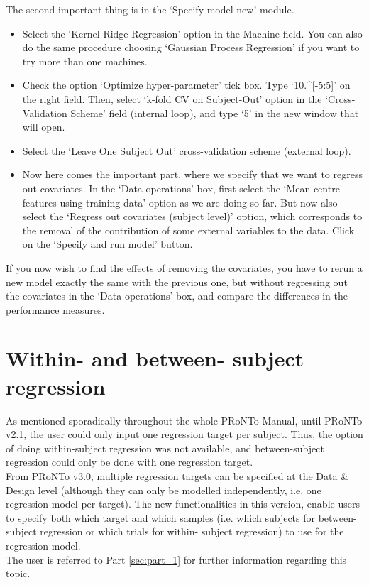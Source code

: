 The second important thing is in the `Specify model new' module.
    
    \begin{itemize}
    
    \item Select the `Kernel Ridge Regression' option in the Machine field. You can also do the same procedure choosing `Gaussian Process Regression' if you want to try more than one machines.
	
	 \item Check the option `Optimize hyper-parameter' tick box. Type `10.\textasciicircum{}[-5:5]' on the right field. Then, select `k-fold CV on Subject-Out' option in the `Cross-Validation Scheme' field (internal loop), and type `5' in the new window that will open.
	
	\item Select the `Leave One Subject Out' cross-validation scheme (external loop).
	
	\item Now here comes the important part, where we specify that we want to regress out covariates. In the `Data operations' box, first select the `Mean centre features using training data' option as we are doing so far. But now also select the `Regress out covariates (subject level)' option, which corresponds to the removal of the contribution of some external variables to the data. Click on the `Specify and run model' button.
	
\end{itemize}

If you now wish to find the effects of removing the covariates, you have to rerun a new model exactly the same with the previous one, but without regressing out the covariates in the `Data operations' box, and compare the differences in the performance measures.









\section{Within- and between- subject regression}

As mentioned sporadically throughout the whole PRoNTo Manual, until PRoNTo v2.1, the user could only input one regression target per subject. Thus, the option of doing within-subject regression was not available, and between-subject regression could only be done with one regression target.
\\

From PRoNTo v3.0, multiple regression targets can be specified at the Data \& Design level (although they can only be modelled independently, i.e. one regression model per target). The new functionalities in this version, enable users to specify both which target and which samples (i.e. which subjects for between-subject regression or which trials for within- subject regression) to use for the regression model.
\\

The user is referred to Part \ref{sec:part_1} for further information regarding this topic.



